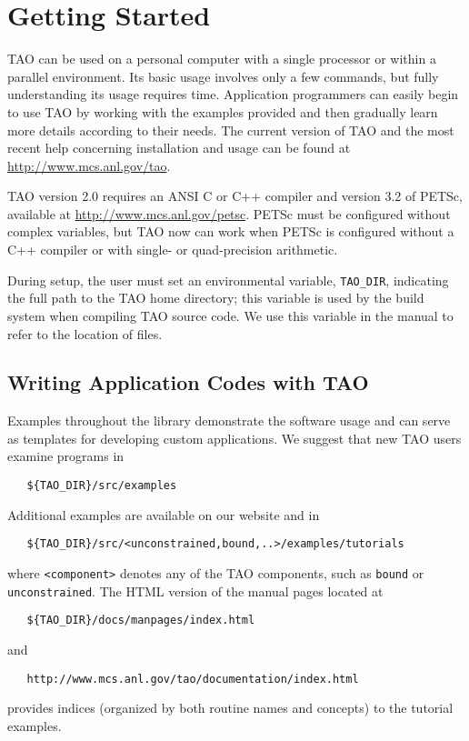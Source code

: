 \chapter{Getting Started}
\label{chapter:intro_tao}

TAO can be used on a personal
computer with a single processor or within a parallel environment.  
Its basic usage involves only a few commands, but fully 
understanding its usage requires time.
Application programmers can easily begin to use TAO by working with 
the examples provided and then gradually learn more details according to
their needs.  The current version of TAO and the most recent help 
concerning installation and usage can be found at  
\url{http://www.mcs.anl.gov/tao}.

TAO version 2.0 requires an ANSI C or C++ compiler and version 3.2 of PETSc, 
available at \url{http://www.mcs.anl.gov/petsc}.  PETSc must be configured 
without complex variables, but TAO now can work when PETSc 
is configured without a C++ compiler or with single- or quad-precision 
arithmetic.

During setup, the user must set an environmental variable, 
\texttt{TAO\_DIR}, indicating the full path to 
the TAO home directory; this variable is used by the build
system when compiling TAO source code.  We use this variable in the
manual to refer to the location of files.

\section{Writing Application Codes with TAO}

Examples throughout the library demonstrate the software usage and
can serve as templates for developing custom applications.  We suggest
that new TAO users examine programs in
\begin{verbatim}
   ${TAO_DIR}/src/examples
\end{verbatim} %
\noindent
Additional examples are available on our website and in
\begin{verbatim}
   ${TAO_DIR}/src/<unconstrained,bound,..>/examples/tutorials
\end{verbatim} 
\noindent
where \texttt{<component>}
denotes any of the TAO components, such as 
\texttt{bound} or \texttt{unconstrained}.
The HTML version of the manual pages located at
\begin{verbatim}
   ${TAO_DIR}/docs/manpages/index.html
\end{verbatim} %
\noindent
and
\begin{verbatim}
   http://www.mcs.anl.gov/tao/documentation/index.html
\end{verbatim}
\noindent
provides indices (organized by both routine names and concepts) to the
tutorial examples.

